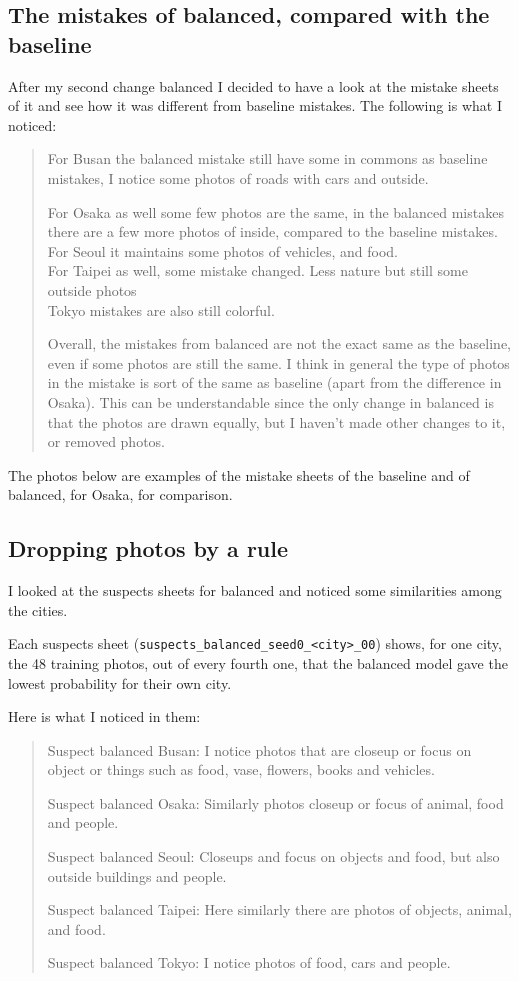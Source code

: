 \documentclass[11pt]{article}
\begin{document}
\subsection*{The mistakes of balanced, compared with the baseline}
After my second change balanced I decided to have a look at the mistake sheets of it and see how it was different from baseline mistakes. The following is what I noticed:
\begin{quote}\small
For Busan the balanced mistake still have some in commons as baseline mistakes, I notice some photos of roads with cars and outside.

For Osaka as well some few photos are the same, in the balanced mistakes there are a few more photos of inside, compared to the baseline mistakes.\\
For Seoul it maintains some photos of vehicles, and food.\\
For Taipei as well, some mistake changed. Less nature but still some outside photos\\
Tokyo mistakes are also still colorful.

Overall, the mistakes from balanced are not the exact same as the baseline, even if some photos are still the same. I think in general the type of photos in the mistake is sort of the same as baseline (apart from the difference in Osaka). This can be understandable since the only change in balanced is that the photos are drawn equally, but I haven’t made other changes to it, or removed photos.
\end{quote}

The photos below are examples of the mistake sheets of the baseline and of balanced, for Osaka, for comparison.


\subsection*{Dropping photos by a rule}
I looked at the suspects sheets for balanced and noticed some similarities among the cities.

Each suspects sheet (\texttt{suspects\_balanced\_seed0\_<city>\_00}) shows, for one city, the 48 training photos, out of every fourth one, that the balanced model gave the lowest probability for their own city.

Here is what I noticed in them:
\begin{quote}\small
Suspect balanced Busan: I notice photos that are closeup or focus on object or things such as food, vase, flowers, books and vehicles.

Suspect balanced Osaka: Similarly photos closeup or focus of animal, food and people.

Suspect balanced Seoul: Closeups and focus on objects and food, but also outside buildings and people.

Suspect balanced Taipei: Here similarly there are photos of objects, animal, and food.

Suspect balanced Tokyo: I notice photos of food, cars and people.
\end{quote}
\end{document}
